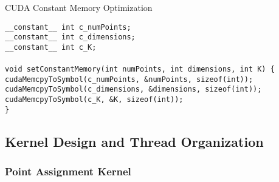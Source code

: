 \documentclass[12pt,a4paper]{article}
\begin{document}
\begin{algorithm}[H]
\caption{CUDA Constant Memory Optimization}
\label{alg:cuda_constant}
\begin{flushleft}
\texttt{\_\_constant\_\_ int c\_numPoints;}\\
\texttt{\_\_constant\_\_ int c\_dimensions;}\\
\texttt{\_\_constant\_\_ int c\_K;}\\
\\
\texttt{void setConstantMemory(int numPoints, int dimensions, int K) \{}\\
\hspace{1cm}\texttt{cudaMemcpyToSymbol(c\_numPoints, \&numPoints, sizeof(int));}\\
\hspace{1cm}\texttt{cudaMemcpyToSymbol(c\_dimensions, \&dimensions, sizeof(int));}\\
\hspace{1cm}\texttt{cudaMemcpyToSymbol(c\_K, \&K, sizeof(int));}\\
\texttt{\}}
\end{flushleft}
\end{algorithm}

\subsection{Kernel Design and Thread Organization}

\subsubsection{Point Assignment Kernel}
\end{document}
